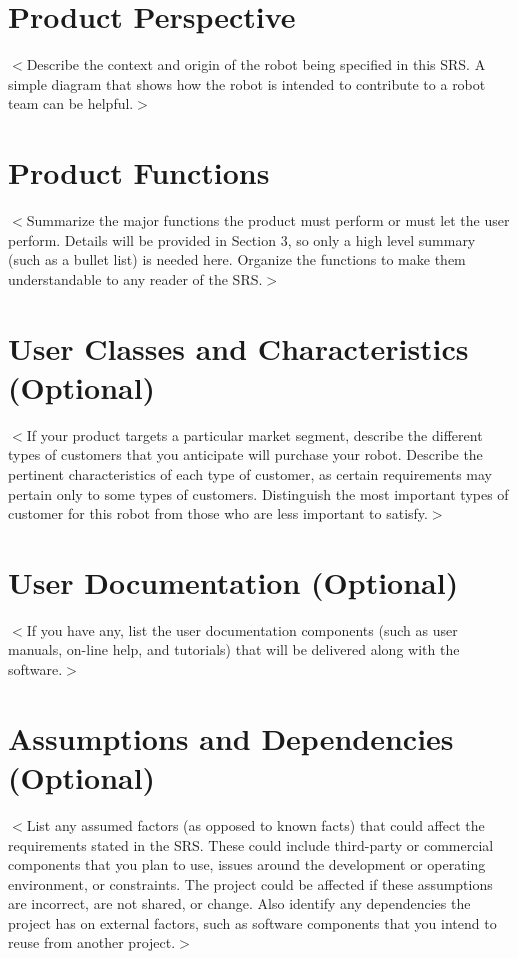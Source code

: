 \documentclass{scrreprt}
\begin{document}
\section{Product Perspective}
$<$Describe the context and origin of the robot being specified in this SRS. A simple diagram that shows how the robot is intended to contribute to a robot team can be helpful.$>$

\section{Product Functions}
$<$Summarize the major functions the product must perform or must let the user perform. Details will be provided in Section 3, so only a high level summary (such as a bullet list) is needed here. Organize the functions to make them understandable to any reader of the SRS.$>$

\section{User Classes and Characteristics (Optional)}
$<$If your product targets a particular market segment, describe the different types of customers that you anticipate will purchase your robot. Describe the pertinent characteristics of each type of customer, as certain requirements may pertain only to some types of customers. Distinguish the most important types of customer for this robot from those who are less important to satisfy.$>$

\section{User Documentation (Optional)}
$<$If you have any, list the user documentation components (such as user manuals, on-line help, and tutorials) that will be delivered along with the software.$>$

\section{Assumptions and Dependencies (Optional)}
$<$List any assumed factors (as opposed to known facts) that could affect the requirements stated in the SRS. These could include third-party or commercial components that you plan to use, issues around the development or operating environment, or constraints. The project could be affected if these assumptions are incorrect, are not shared, or change. Also identify any dependencies the project has on external factors, such as software components that you intend to reuse from another project.$>$
\end{document}
